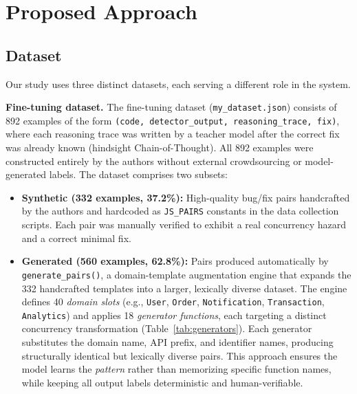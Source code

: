 \documentclass[runningheads]{llncs}
\begin{document}
\section{Proposed Approach}
\label{sec:design}

\subsection{Dataset}
\label{sec:design:dataset}

Our study uses three distinct datasets, each serving a different role in
the system.

\textbf{Fine-tuning dataset.}
The fine-tuning dataset (\texttt{my\_dataset.json}) consists of 892 examples of the form
\texttt{(code, detector\_output, reasoning\_trace, fix)}, where each
reasoning trace was written by a teacher model after the correct fix was
already known (hindsight Chain-of-Thought).
All 892 examples were constructed entirely by the authors without
external crowdsourcing or model-generated labels.
The dataset comprises two subsets:

\begin{itemize}[leftmargin=2em]
  \item \textbf{Synthetic (332 examples, 37.2\%):} High-quality
    bug/fix pairs handcrafted by the authors and hardcoded as
    \texttt{JS\_PAIRS} constants in the data collection scripts.
    Each pair was manually verified to exhibit a real concurrency hazard
    and a correct minimal fix.
  \item \textbf{Generated (560 examples, 62.8\%):} Pairs produced
    automatically by \texttt{generate\_pairs()}, a domain-template
    augmentation engine that expands the 332 handcrafted templates
    into a larger, lexically diverse dataset.
    The engine defines 40 \emph{domain slots}
    (e.g., \texttt{User}, \texttt{Order}, \texttt{Notification},
    \texttt{Transaction}, \texttt{Analytics})
    and applies 18 \emph{generator functions}, each targeting a
    distinct concurrency transformation (Table~\ref{tab:generators}).
    Each generator substitutes the domain name, API prefix, and
    identifier names, producing structurally identical but lexically
    diverse pairs.
    This approach ensures the model learns the \emph{pattern}
    rather than memorizing specific function names, while keeping
    all output labels deterministic and human-verifiable.
\end{itemize}
\end{document}
